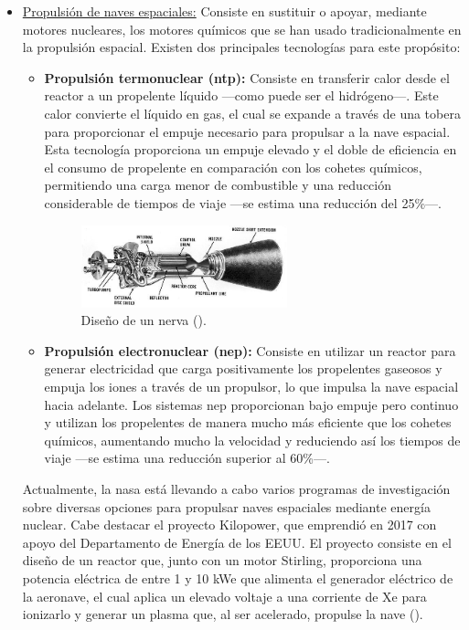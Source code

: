 \begin{itemize}
  \item \underline{Propulsión de naves espaciales:} Consiste en sustituir o apoyar, mediante motores nucleares, los motores químicos que se han usado tradicionalmente en la propulsión espacial. Existen dos principales tecnologías para este propósito:
  \begin{itemize}
    \item \textbf{Propulsión termonuclear (\acrshort{ntp}):} Consiste en transferir calor desde el reactor a un propelente líquido ---como puede ser el hidrógeno---. Este calor convierte el líquido en gas, el cual se expande a través de una tobera para proporcionar el empuje necesario para propulsar a la nave espacial. Esta tecnología proporciona un empuje elevado y el doble de eficiencia en el consumo de propelente en comparación con los cohetes químicos, permitiendo una carga menor de combustible y una reducción considerable de tiempos de viaje ---se estima una reducción del 25\%---.
    
    \begin{figure}[h]
      \centering
      \includegraphics[width=0.6\textwidth]{content/figures/rover_nerva_engine.jpg}
      \caption{Diseño de un \acrfull{nerva} (\cite{nasa_space_nuclear_propulsion}).}
      \label{fig:nasa_space_nuclear_propulsion}
    \end{figure}

    \newpage
    \item \textbf{Propulsión electronuclear (\acrshort{nep}):} Consiste en utilizar un reactor para generar electricidad que carga positivamente los propelentes gaseosos y empuja los iones a través de un propulsor, lo que impulsa la nave espacial hacia adelante. Los sistemas \acrshort{nep} proporcionan bajo empuje pero continuo y utilizan los propelentes de manera mucho más eficiente que los cohetes químicos, aumentando mucho la velocidad y reduciendo así los tiempos de viaje ---se estima una reducción superior al 60\%---.
  \end{itemize}

  Actualmente, la \acrshort{nasa} está llevando a cabo varios programas de investigación sobre diversas opciones para propulsar naves espaciales mediante energía nuclear. Cabe destacar el proyecto Kilopower, que emprendió en 2017 con apoyo del Departamento de Energía de los EEUU. El proyecto consiste en el diseño de un reactor  que, junto con un motor Stirling, proporciona una potencia eléctrica de entre 1 y 10 kWe que alimenta el generador eléctrico de la aeronave, el cual aplica un elevado voltaje a una corriente de Xe para ionizarlo y generar un plasma que, al ser acelerado, propulse la nave (\cite{nasa_space_nuclear_propulsion}).


\end{itemize}
